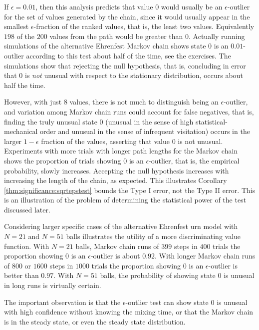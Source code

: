 \documentclass[12pt]{article}
\begin{document}
\begin{example}
    If \( \epsilon = 0.01 \), then this analysis predicts that value \(
    0 \) would usually be an \( \epsilon \)-outlier for the set of
    values generated by the chain, since it would usually appear in the
    smallest \( \epsilon \)-fraction of the ranked values, that is, the
    least two values.  Equivalently \( 198 \) of the \( 200 \) values
    from the path would be greater than \( 0 \).  Actually running
    simulations of the alternative Ehrenfest Markov chain shows state \(
    0 \) is an \( 0.01 \)-outlier according to this test about half of
    the time, see the exercises.  The simulations show that rejecting
    the null hypothesis, that is, concluding in error that \( 0 \) is
    \emph{not} unusual with respect to the stationary distribution,
    occurs about half the time.

    However, with just \( 8 \) values, there is not much to distinguish
    being an \( \epsilon \)-outlier, and variation among Markov chain
    runs could account for false negatives, that is, finding the truly
    unusual state \( 0 \) (unusual in the sense of high
    statistical-mechanical order and unusual in the sense of infrequent
    visitation) occurs in the larger \( 1 - \epsilon \) fraction of the
    values, asserting that value \( 0 \) is not unusual. Experiments
    with more trials with longer path lengths for the Markov chain shows
    the proportion of trials showing \( 0 \) is an \( \epsilon \)-outlier,
    that is, the empirical probability, slowly increases.  Accepting the
    null hypothesis increases with increasing the length of the chain,
    as expected.  This illustrates Corollary~%
    \ref{thm:significance:sqrtepstest} bounds the Type I error, not the
    Type II error.  This is an illustration of the problem of
    determining the statistical power of the test discussed later.

    Considering larger specific cases of the alternative Ehrenfest urn
    model%
    with \( N = 21 \) and \( N = 51 \) balls illustrates the utility of
    a more discriminating value function.  With \( N = 21 \) balls,
    Markov chain runs of \( 399 \) steps in \( 400 \) trials the
    proportion showing \( 0 \) is an \( \epsilon \)-outlier is about \(
    0.92 \).  With longer Markov chain runs of \( 800 \) or \( 1600 \)
    steps in \( 1000 \) trials the proportion showing \( 0 \) is an \(
    \epsilon \)-outlier is better than \( 0.97 \).  With \( N = 51 \)
    balls, the probability of showing state \( 0 \) is unusual in long
    runs is virtually certain.

    The important observation is that the \( \epsilon \)-outlier test
    can show state \( 0 \) is unusual with high confidence without
    knowing the mixing time, or that the Markov chain is in the steady
    state, or even the steady state distribution.

\end{example}
\end{document}
